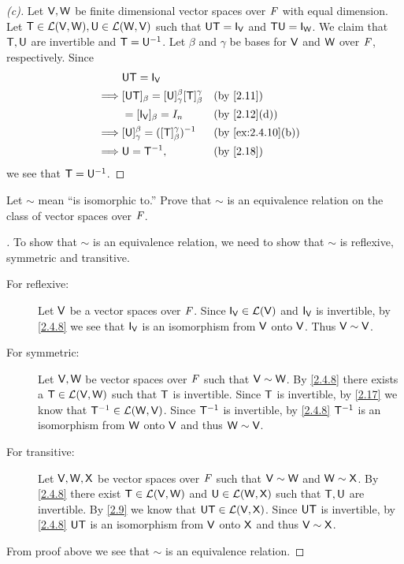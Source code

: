 \begin{proof}[(c)]
  Let \(\mathsf{V}, \mathsf{W}\) be finite dimensional vector spaces over \(\mathit{F}\) with equal dimension.
  Let \(\mathsf{T} \in \mathcal{L}(\mathsf{V}, \mathsf{W}), \mathsf{U} \in \mathcal{L}(\mathsf{W}, \mathsf{V})\) such that \(\U \T = \IT[\V]\) and \(\T \U = \IT[\W]\).
  We claim that \(\mathsf{T}, \mathsf{U}\) are invertible and \(\mathsf{T} = \mathsf{U}^{-1}\).
  Let \(\beta\) and \(\gamma\) be bases for \(\mathsf{V}\) and \(\mathsf{W}\) over \(\mathit{F}\), respectively.
  Since
  \begin{align*}
             & \U \T = \IT[\V]                                                                      \\
    \implies & [\U \T]_{\beta} = [\U]_{\gamma}^{\beta} [\T]_{\beta}^{\gamma} &  & \by{2.11}         \\
             & = [\IT[\V]]_{\beta} = I_n                                     &  & \by{2.12}[d]      \\
    \implies & [\U]_{\gamma}^{\beta} = ([\T]_{\beta}^{\gamma})^{-1}          &  & \by{ex:2.4.10}[b] \\
    \implies & \U = \T^{-1},                                                 &  & \by{2.18}
  \end{align*}
  we see that \(\mathsf{T} = \mathsf{U}^{-1}\).
\end{proof}

\setcounter{ex}{12}
\begin{ex}\label{ex:2.4.13}
  Let \(\sim\) mean ``is isomorphic to.''
  Prove that \(\sim\) is an equivalence relation on the class of vector spaces over \(\mathit{F}\).
\end{ex}

\begin{proof}[]
  To show that \(\sim\) is an equivalence relation, we need to show that \(\sim\) is reflexive, symmetric and transitive.
  \begin{description}
    \item[For reflexive:]
      Let \(\mathsf{V}\) be a vector spaces over \(\mathit{F}\).
      Since \(\IT[\V] \in \ls(\V)\) and \(\IT[\V]\) is invertible, by \cref{2.4.8} we see that \(\IT[\V]\) is an isomorphism from \(\mathsf{V}\) onto \(\mathsf{V}\).
      Thus \(\mathsf{V} \sim \mathsf{V}\).
    \item[For symmetric:]
      Let \(\mathsf{V}, \mathsf{W}\) be vector spaces over \(\mathit{F}\) such that \(\mathsf{V} \sim \mathsf{W}\).
      By \cref{2.4.8} there exists a \(\mathsf{T} \in \mathcal{L}(\mathsf{V}, \mathsf{W})\) such that \(\mathsf{T}\) is invertible.
      Since \(\mathsf{T}\) is invertible, by \cref{2.17} we know that \(\mathsf{T}^{-1} \in \mathcal{L}(\mathsf{W}, \mathsf{V})\).
      Since \(\mathsf{T}^{-1}\) is invertible, by \cref{2.4.8} \(\mathsf{T}^{-1}\) is an isomorphism from \(\mathsf{W}\) onto \(\mathsf{V}\) and thus \(\mathsf{W} \sim \mathsf{V}\).
    \item[For transitive:]
      Let \(\mathsf{V}, \mathsf{W}, \mathsf{X}\) be vector spaces over \(\mathit{F}\) such that \(\mathsf{V} \sim \mathsf{W}\) and \(\mathsf{W} \sim \mathsf{X}\).
      By \cref{2.4.8} there exist \(\mathsf{T} \in \mathcal{L}(\mathsf{V}, \mathsf{W})\) and \(\mathsf{U} \in \mathcal{L}(\mathsf{W}, \mathsf{X})\) such that \(\mathsf{T}, \mathsf{U}\) are invertible.
      By \cref{2.9} we know that \(\mathsf{U} \mathsf{T} \in \mathcal{L}(\mathsf{V}, \mathsf{X})\).
      Since \(\mathsf{U} \mathsf{T}\) is invertible, by \cref{2.4.8} \(\mathsf{U} \mathsf{T}\) is an isomorphism from \(\mathsf{V}\) onto \(\mathsf{X}\) and thus \(\mathsf{V} \sim \mathsf{X}\).
  \end{description}
  From proof above we see that \(\sim\) is an equivalence relation.
\end{proof}

